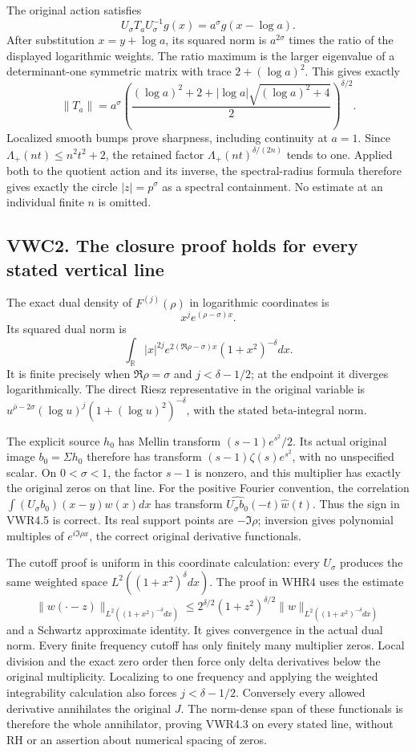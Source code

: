 The original action satisfies \[
U_\sigma T_aU_\sigma^{-1}g(x)=a^\sigma g(x-\log a).
\] After substitution \(x=y+\log a\), its squared norm is
\(a^{2\sigma}\) times the ratio of the displayed logarithmic weights.
The ratio maximum is the larger eigenvalue of a determinant-one
symmetric matrix with trace \(2+(\log a)^2\). This gives exactly \[
\|T_a\|=a^\sigma
\left(\frac{(\log a)^2+2+|\log a|\sqrt{(\log a)^2+4}}2\right)^{\delta/2}.
\] Localized smooth bumps prove sharpness, including continuity at
\(a=1\). Since \(\Lambda_+(nt)\leq n^2t^2+2\), the retained factor
\(\Lambda_+(nt)^{\delta/(2n)}\) tends to one. Applied both to the
quotient action and its inverse, the spectral-radius formula therefore
gives exactly the circle \(|z|=p^\sigma\) as a spectral containment. No
estimate at an individual finite \(n\) is omitted.

\subsection{VWC2. The closure proof holds for every stated vertical
line}\label{vwc2.-the-closure-proof-holds-for-every-stated-vertical-line}

The exact dual density of \(F^{(j)}(\rho)\) in logarithmic coordinates
is \[
x^j e^{(\rho-\sigma)x}.
\] Its squared dual norm is \[
\int_{\mathbb R}|x|^{2j}e^{2(\Re\rho-\sigma)x}(1+x^2)^{-\delta}dx.
\] It is finite precisely when \(\Re\rho=\sigma\) and \(j<\delta-1/2\);
at the endpoint it diverges logarithmically. The direct Riesz
representative in the original variable is
\(u^{\bar\rho-2\sigma}(\log u)^j(1+(\log u)^2)^{-\delta}\), with the
stated beta-integral norm.

The explicit source \(h_0\) has Mellin transform \((s-1)e^{s^2}/2\). Its
actual original image \(b_0=\Sigma h_0\) therefore has transform
\((s-1)\zeta(s)e^{s^2}\), with no unspecified scalar. On \(0<\sigma<1\),
the factor \(s-1\) is nonzero, and this multiplier has exactly the
original zeros on that line. For the positive Fourier convention, the
correlation \(\int (U_\sigma b_0)(x-y)w(x)dx\) has transform
\(\widehat{U_\sigma b_0}(-t)\widehat w(t)\). Thus the sign in VWR4.5 is
correct. Its real support points are \(-\Im\rho\); inversion gives
polynomial multiples of \(e^{i\Im\rho x}\), the correct original
derivative functionals.

The cutoff proof is uniform in this coordinate calculation: every
\(U_\sigma\) produces the same weighted space
\(L^2((1+x^2)^\delta dx)\). The proof in WHR4 uses the estimate \[
\|w(\cdot-z)\|_{L^2((1+x^2)^{-\delta}dx)}
\leq2^{\delta/2}(1+z^2)^{\delta/2}
\|w\|_{L^2((1+x^2)^{-\delta}dx)}
\] and a Schwartz approximate identity. It gives convergence in the
actual dual norm. Every finite frequency cutoff has only finitely many
multiplier zeros. Local division and the exact zero order then force
only delta derivatives below the original multiplicity. Localizing to
one frequency and applying the weighted integrability calculation also
forces \(j<\delta-1/2\). Conversely every allowed derivative annihilates
the original \(J\). The norm-dense span of these functionals is
therefore the whole annihilator, proving VWR4.3 on every stated line,
without RH or an assertion about numerical spacing of zeros.

